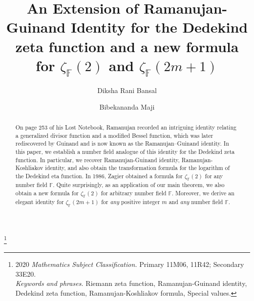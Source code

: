 \documentclass[12pt,reqno]{amsart}
\renewcommand{\(}{\left\(}
\renewcommand{\)}{\right\)}
\renewcommand{\[}{\left\[}
\renewcommand{\]}{\right\]}
\numberwithin{equation}{section}
\theoremstyle{plain}
\begin{document}
\title[An Extension of Ramanujan-Guinand Identity]{An Extension of Ramanujan-Guinand Identity for the Dedekind zeta function and a new formula for $\zeta_\mathbb{F}(2)$ and $\zeta_\mathbb{F}(2m+1)$} 



\author{Diksha Rani Bansal}
\address{Diksha Rani\\ Department of Mathematics \\
Indian Institute of Technology Indore \\
Indore, Simrol, Madhya Pradesh 453552, India.} 


\author{Bibekananda Maji}
\address{Bibekananda Maji\\ Department of Mathematics \\
Indian Institute of Technology Indore \\
Indore, Simrol, Madhya Pradesh 453552, India.} 


\thanks{2020 \textit{Mathematics Subject Classification.} Primary 11M06,  11R42; Secondary 33E20.\\
\textit{Keywords and phrases.} Riemann zeta function,  Ramanujan-Guinand identity,  Dedekind zeta function, Ramanujan-Koshliakov formula, Special values.}





\begin{abstract}
On page 253 of his Lost Notebook, Ramanujan recorded an intriguing identity relating a generalized divisor function and a modified Bessel function, which was later rediscovered by Guinand and is now known as the Ramanujan–Guinand identity. In this paper, we establish a number field analogue of this identity for the Dedekind zeta function. In particular, we recover Ramanujan-Guinand identity, Ramanujan-Koshliakov identity, and also obtain the transformation formula for the logarithm of the Dedekind eta function.
In 1986, Zagier obtained a formula for $\zeta_\mathbb{F}(2)$ for any number field $\mathbb{F}$. Quite surprisingly, as an application of our main theorem, we also obtain a new formula for $\zeta_\mathbb{F}(2)$ for arbitrary number field $\mathbb{F}$. Moreover, we derive an elegant identity for $\zeta_\mathbb{F}(2m+1)$ for \emph{any} positive integer $m$ and \emph{any} number field $\mathbb{F}$.

%
\end{abstract}
\end{document}
